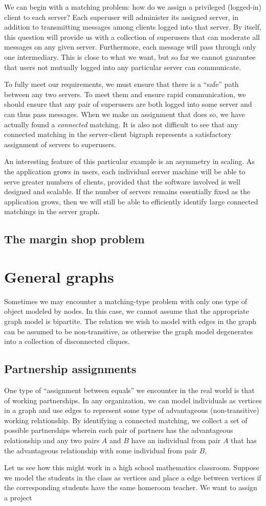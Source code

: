 We can begin with a matching problem: how do we assign a privileged (logged-in) client to each server?  Each superuser will administer its assigned server, in addition to transmitting messages among clients logged into that server.  By itself, this question will provide us with a collection of superusers that can moderate all messages on any given server.  Furthermore, each message will pass through only one intermediary.  This is close to what we want, but so far we cannot guarantee that users not mutually logged into any particular server can communicate.

To fully meet our requirements, we must ensure that there is a ``safe'' path between any two servers.  To meet them and ensure rapid communication, we should ensure that any pair of superusers are both logged into some server and can thus pass messages.  When we make an assignment that does so, we have actually found a {\it connected} matching.  It is also not difficult to see that any connected matching in the server-client bigraph represents a satisfactory assignment of servers to superusers.

An interesting feature of this particular example is an asymmetry in scaling.  As the application grows in users, each individual server machine will be able to serve greater numbers of clients, provided that the software involved is well designed and scalable.  If the number of servers remains essentially fixed as the application grows, then we will still be able to efficiently identify large connected matchings in the server graph.

	\subsection{The margin shop problem}


\section{General graphs}

Sometimes we may encounter a matching-type problem with only one type of object modeled by nodes.  In this case, we cannot assume that the appropriate graph model is bipartite.  The relation we wish to model with edges in the graph can be assumed to be non-transitive, as otherwise the graph model degenerates into a collection of disconnected cliques.
	\subsection{Partnership assignments}
One type of ``assignment between equals'' we encounter in the real world is that of working partnerships.  In any organization, we can model individuals as vertices in a graph and use edges to represent some type of advantageous (non-transitive) working relationship.  By identifying a connected matching, we collect a set of possible partnerships wherein each pair of partners has the advantageous relationship and any two pairs $A$ and $B$ have an individual from pair $A$ that has the advantageous relationship with some individual from pair $B$,

Let us see how this might work in a high school mathematics classroom.  Suppose we model the students in the class as vertices and place a edge between vertices if the corresponding students have the same homeroom teacher.  We want to assign a project 
	

